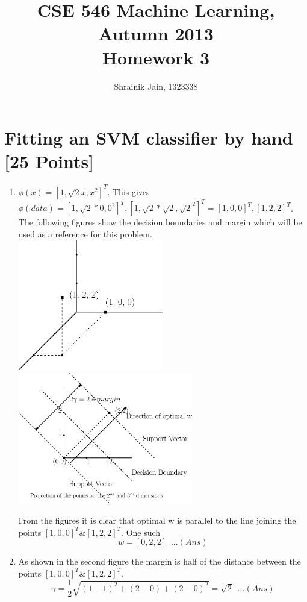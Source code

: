 \documentclass[letterpaper]{article}
\title{CSE 546 Machine Learning, Autumn 2013 \\ Homework 3}
\date{Shrainik Jain, 1323338}
\begin{document}
\maketitle


\section{Fitting an SVM classifier by hand [25 Points]}
\begin{enumerate}
\item $\phi(x) = [1, \sqrt{2}x,x^2]^T$. This gives $\phi(data) = [1, \sqrt{2}*0, 0^2]^T , [1, \sqrt{2}*\sqrt{2}, \sqrt{2}^2]^T = [1, 0, 0]^T, [1, 2, 2]^T$. The following figures show the decision boundaries and margin which will be used as a reference for this problem.\\
\includegraphics[width = 2.5in,keepaspectratio]{HW3_figure1.eps}
\includegraphics[width = 3in, keepaspectratio]{HW3_figure2.eps}

From the figures it is clear that optimal w is parallel to the line joining the points $[1, 0, 0]^T  \&  [1, 2, 2]^T$. One such
\begin{equation}
 w = [0, 2, 2] \,\,\, ...(Ans)
\end{equation}

\item As shown in the second figure the margin is half of the distance between the points $[1, 0, 0]^T  \&  [1, 2, 2]^T$.
\begin{equation}
\gamma = \frac{1}{2}\sqrt{(1-1)^2 + (2-0) + (2-0)^2} = \sqrt{2} \,\,\, ...(Ans)
\end{equation}


\end{enumerate}
\end{document}

